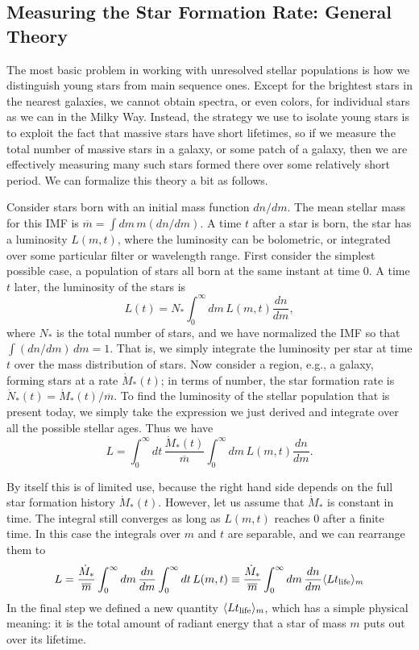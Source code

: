 \subsection{Measuring the Star Formation Rate: General Theory}

The most basic problem in working with unresolved stellar populations is how we distinguish young stars from main sequence ones. Except for the brightest stars in the nearest galaxies, we cannot obtain spectra, or even colors, for individual stars as we can in the Milky Way. Instead, the strategy we use to isolate young stars is to exploit the fact that massive stars have short lifetimes, so if we measure the total number of massive stars in a galaxy, or some patch of a galaxy, then we are effectively measuring many such stars formed there over some relatively short period. We can formalize this theory a bit as follows.

Consider stars born with an initial mass function $dn/dm$. The mean stellar mass for this IMF is $\overline{m} = \int dm\, m(dn/dm)$. A time $t$ after a star is born, the star has a luminosity $L(m,t)$, where the luminosity can be bolometric, or integrated over some particular filter or wavelength range. First consider the simplest possible case, a population of stars all born at the same instant at time $0$. A time $t$ later, the luminosity of the stars is
\begin{equation}
L(t) = N_* \int_0^{\infty} dm\, L(m,t) \frac{dn}{dm},
\end{equation}
where $N_*$ is the total number of stars, and we have normalized the IMF so that $\int (dn/dm) \, dm = 1$. That is, we simply integrate the luminosity per star at time $t$ over the mass distribution of stars. Now consider a region, e.g., a galaxy, forming stars at a rate $\dot{M}_*(t)$; in terms of number, the star formation rate is $\dot{N}_*(t) = \dot{M}_*(t)/\overline{m}$. To find the luminosity of the stellar population that is present today, we simply take the expression we just derived and integrate over all the possible stellar ages. Thus we have
\begin{equation}
L =  \int_{0}^\infty dt\, \frac{\dot{M}_*(t)}{\overline{m}}  \int_0^{\infty} dm\, L(m,t) \frac{dn}{dm}.
\end{equation}

By itself this is of limited use, because the right hand side depends on the full star formation history $\dot{M}_*(t)$. However, let us assume that $\dot{M}_*$ is constant in time. The integral still converges as long as $L(m,t)$ reaches 0 after a finite time. In this case the integrals over $m$ and $t$ are separable, and we can rearrange them to
\begin{equation}
\label{eq:sfrtol}
L = \frac{\dot{M}_*}{\overline{m}} \int_0^{\infty} dm \, \frac{dn}{dm} \int_0^\infty dt \, L(m,t) \equiv \frac{\dot{M}_*}{\overline{m}} \int_0^{\infty} dm \, \frac{dn}{dm} \langle L t_{\rm life} \rangle_m 
\end{equation}
In the final step we defined a new quantity $\langle L t_{\rm life} \rangle_m$, which has a simple physical meaning: it is the total amount of radiant energy that a star of mass $m$ puts out over its lifetime.

